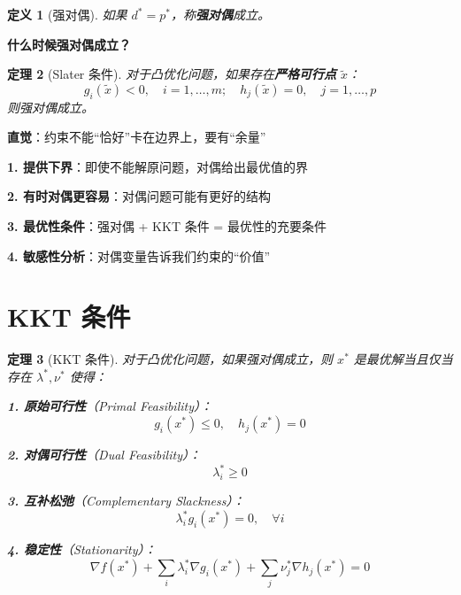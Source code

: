 \documentclass[12pt, a4paper]{ctexart}
\newtheorem{theorem}{定理}[section]
\newtheorem{definition}[theorem]{定义}
\begin{document}
\begin{blackboard}[强对偶]

\begin{definition}[强对偶]
如果 $d^* = p^*$，称\textbf{强对偶}成立。
\end{definition}

\textbf{什么时候强对偶成立？}

\begin{theorem}[Slater 条件]
对于凸优化问题，如果存在\textbf{严格可行点} $\tilde{x}$：
\[
g_i(\tilde{x}) < 0, \quad i = 1, \ldots, m; \quad h_j(\tilde{x}) = 0, \quad j = 1, \ldots, p
\]
则强对偶成立。
\end{theorem}

\textbf{直觉}：约束不能``恰好''卡在边界上，要有``余量''

\end{blackboard}

\begin{insight}[对偶的价值]

\textbf{1. 提供下界}：即使不能解原问题，对偶给出最优值的界

\textbf{2. 有时对偶更容易}：对偶问题可能有更好的结构

\textbf{3. 最优性条件}：强对偶 + KKT 条件 = 最优性的充要条件

\textbf{4. 敏感性分析}：对偶变量告诉我们约束的``价值''

\end{insight}

\section{KKT 条件}

\begin{blackboard}

\begin{theorem}[KKT 条件]
对于凸优化问题，如果强对偶成立，则 $x^*$ 是最优解当且仅当存在 $\lambda^*, \nu^*$ 使得：

\textbf{1. 原始可行性}（Primal Feasibility）：
\[
g_i(x^*) \leq 0, \quad h_j(x^*) = 0
\]

\textbf{2. 对偶可行性}（Dual Feasibility）：
\[
\lambda_i^* \geq 0
\]

\textbf{3. 互补松弛}（Complementary Slackness）：
\[
\lambda_i^* g_i(x^*) = 0, \quad \forall i
\]

\textbf{4. 稳定性}（Stationarity）：
\[
\nabla f(x^*) + \sum_i \lambda_i^* \nabla g_i(x^*) + \sum_j \nu_j^* \nabla h_j(x^*) = 0
\]
\end{theorem}

\end{blackboard}
\end{document}
